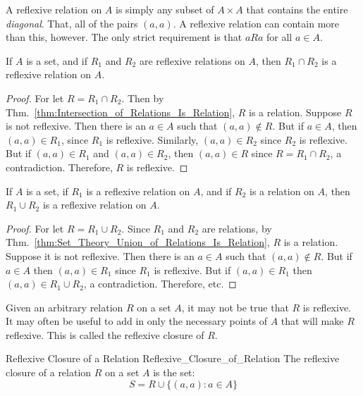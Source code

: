     A reflexive relation on $A$ is simply any subset of
    $A\times{A}$ that contains the entire \textit{diagonal}. That,
    all of the pairs $(a,a)$. A reflexive relation can contain more
    than this, however. The only strict requirement is that
    $aRa$ for all $a\in{A}$.
    \begin{theorem}
        If $A$ is a set, and if $R_{1}$ and $R_{2}$ are reflexive
        relations on $A$, then $R_{1}\cap{R}_{2}$ is a reflexive
        relation on $A$.
    \end{theorem}
    \begin{proof}
        For let $R=R_{1}\cap{R}_{2}$. Then by
        Thm.~\ref{thm:Intersection_of_Relations_Is_Relation}, $R$ is a relation.
        Suppose $R$ is not reflexive.
        Then there is an $a\in{A}$ such that $(a,a)\notin{R}$. But
        if $a\in{A}$, then $(a,a)\in{R}_{1}$, since $R_{1}$ is
        reflexive. Similarly, $(a,a)\in{R}_{2}$ since $R_{2}$ is
        reflexive. But if $(a,a)\in{R}_{1}$ and $(a,a)\in{R}_{2}$,
        then $(a,a)\in{R}$ since $R=R_{1}\cap{R}_{2}$, a
        contradiction. Therefore, $R$ is reflexive.
    \end{proof}
    \begin{theorem}
        If $A$ is a set, if $R_{1}$ is a reflexive relation on
        $A$, and if $R_{2}$ is a relation on $A$, then
        $R_{1}\cup{R}_{2}$ is a reflexive relation on $A$.
    \end{theorem}
    \begin{proof}
        For let $R=R_{1}\cup{R}_{2}$. Since $R_{1}$ and $R_{2}$ are
        relations, by
        Thm.~\ref{thm:Set_Theory_Union_of_Relations_Is_Relation},
        $R$ is a relation. Suppose it is not reflexive.
        Then there is an $a\in{A}$ such that
        $(a,a)\notin{R}$. But if $a\in{A}$ then $(a,a)\in{R}_{1}$
        since $R_{1}$ is reflexive. But if $(a,a)\in{R}_{1}$ then
        $(a,a)\in{R}_{1}\cup{R}_{2}$, a contradiction.
        Therefore, etc.
    \end{proof}
    Given an arbitrary relation $R$ on a set $A$, it may not be
    true that $R$ is reflexive. It may often be useful to add in
    only the necessary points of $A$ that will make $R$
    reflexive. This is called the reflexive closure of $R$.
    \begin{fdefinition}{Reflexive Closure of a Relation}
                       {Reflexive_Closure_of_Relation}
        The reflexive closure of a relation $R$ on a set $A$
        is the set:
        \begin{equation}
            S=R\cup\{(a,a):a\in{A}\}
        \end{equation}
    \end{fdefinition}

